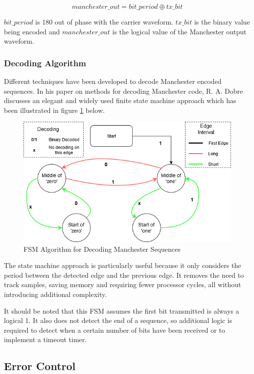 \begin{equation}
	\label{eqn:manchesterencode}
	manchester\_out = bit\_period \oplus tx\_bit
\end{equation}

$bit\_period$ is 180\textdegree{} out of phase with the carrier waveform. $tx\_bit$ is the binary value being encoded and $manchester\_out$ is the logical value of the Manchester output waveform.


\subsubsection{Decoding Algorithm}
Different techniques have been developed to decode Manchester encoded sequences. In his paper on methods for decoding Manchester code, R. A. Dobre discusses an elegant and widely used finite state machine approach which has been illustrated in figure \ref{fig:manchesterdecodingfsm} below. \cite{Dobre2014}

\begin{figure}[H]
	\centering
	\includegraphics[width=0.7\linewidth]{figures/litreview/manchester_decoding_fsm.png}
	\caption{FSM Algorithm for Decoding Manchester Sequences}
	\label{fig:manchesterdecodingfsm}
\end{figure}

The state machine approach is particularly useful because it only considers the period between the detected edge and the previous edge. It removes the need to track samples, saving memory and requiring fewer processor cycles, all without introducing additional complexity.

It should be noted that this FSM assumes the first bit transmitted is always a logical 1. It also does not detect the end of a sequence, so additional logic is required to detect when a certain number of bits have been received or to implement a timeout timer.

\subsection{Error Control}

